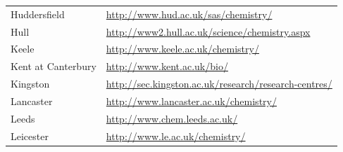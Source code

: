 \begin{table}[H]
\begin{tabular}{||p{2.5cm}|Y||}
 \footnotesize{Huddersfield}                       & \footnotesize{\url{http://www.hud.ac.uk/sas/chemistry/}}                                                                                                  \\
 \footnotesize{Hull       }                        & \footnotesize{\url{http://www2.hull.ac.uk/science/chemistry.aspx}}                                                                                        \\
 \footnotesize{Keele     }                         & \footnotesize{\url{http://www.keele.ac.uk/chemistry/}}                                                                                                    \\
 \footnotesize{Kent at Canterbury}                 & \footnotesize{\url{http://www.kent.ac.uk/bio/}}                                                                                                           \\
 \footnotesize{Kingston     }                      & \footnotesize{\url{http://sec.kingston.ac.uk/research/research-centres/}}                    
 \\
 \footnotesize{Lancaster   }                       & \footnotesize{\url{http://www.lancaster.ac.uk/chemistry/}}                                                                                                \\
\footnotesize{Leeds      }                        & \footnotesize{\url{http://www.chem.leeds.ac.uk/}}                                                                                                         \\
 \footnotesize{Leicester }                         & \footnotesize{\url{http://www.le.ac.uk/chemistry/}}                                                                                                                                                               
\\
\hline 
 \end{tabular}
 \end{table}
 
